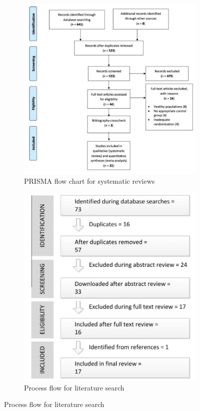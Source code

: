 \begin{figure}[H]
     \centering
     \begin{subfigure}[b]{0.52\textwidth}
         \centering
         \includegraphics[width=\textwidth]{assets/LittProcessFlow-Case01.jpg}
         \caption{PRISMA flow chart for systematic reviews \cite{ref01}}
         \label{fig:PRISMA-01}
     \end{subfigure}
     \hfill
     \begin{subfigure}[b]{0.46\textwidth}
         \centering
         \includegraphics[width=\textwidth]{assets/LittProcessFlow-Case03.jpg}
         \caption{Process flow for literature search \cite{ref03}}
         \label{fig:PRISMA-03}
     \end{subfigure}
\end{figure}
